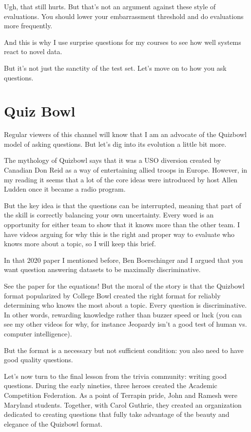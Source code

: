 Ugh, that still hurts. But that’s not an argument against these style of evaluations.  You should lower your embarrassment threshold and do evaluations more frequently.

And this is why I use surprise questions for my courses to see how well systems react to novel data.

But it’s not just the sanctity of the test set.  Let’s move on to how you ask questions.

\section{Quiz Bowl}
\label{sec:manchester:qb}

Regular viewers of this channel will know that I am an advocate of the Quizbowl model of asking questions.  But let’s dig into its evolution a little bit more.  

The mythology of Quizbowl says that it was a USO diversion created by Canadian Don Reid as a way of entertaining allied troops in Europe.  However, in my reading it seems that a lot of the core ideas were introduced by host Allen Ludden once it became a radio program.  

But the key idea is that the questions can be interrupted, meaning that part of the skill is correctly balancing your own uncertainty.  Every word is an opportunity for either team to show that it knows more than the other team.  I have videos arguing for why this is the right and proper way to evaluate who knows more about a topic, so I will keep this brief.  

In that 2020 paper I mentioned before, Ben Boerschinger and I argued that you want question answering datasets to be maximally discriminative. 

See the paper for the equations!  But the moral of the story is that the Quizbowl format popularized by College Bowl created the right format for reliably determining who knows the most about a topic.  Every question is discriminative.  In other words, rewarding knowledge rather than buzzer speed or luck (you can see my other videos for why, for instance Jeopardy isn’t a good test of human vs. computer intelligence).

But the format is a necessary but not sufficient condition: you also need to have good quality questions.  

Let’s now turn to the final lesson from the trivia community: writing good questions.  During the early nineties, three heroes created the Academic Competition Federation.  As a point of Terrapin pride, John and Ramesh were Maryland students.  Together, with Carol Guthrie, they created an organization dedicated to creating questions that fully take advantage of the beauty and elegance of the Quizbowl format.

